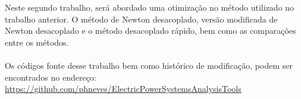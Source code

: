 \documentclass[Portugues,Final]{tese-FT}
\begin{document}
\paginasiniciais
\begin{resumo}

Neste segundo trabalho, será abordado uma otimização no método utilizado no trabalho anterior. O método de Newton desacoplado, versão modificada de Newton desacoplado e o método desacoplado rápido, bem como as comparações entre os métodos.\\\\
Os códigos fonte desse trabalho bem como histórico de modificação, podem ser encontrados no endereço: \href{https://github.com/phneves/ElectricPowerSystemsAnalysisTools}{https://github.com/phneves/ElectricPowerSystemsAnalysisTools}



\end{resumo}


%

\renewcommand{\nomname}{Lista de Abreviações e Siglas}
\printnomenclature[3cm]


\tableofcontents
\fimdaspaginasiniciais


%
%










%

%

\begin{singlespacing}
\setlength\bibitemsep{10pt}   %
\printbibliography[heading=bibintoc, %
                   title={Referências bibliográficas} %
                  ]
\end{singlespacing}


%
\end{document}
